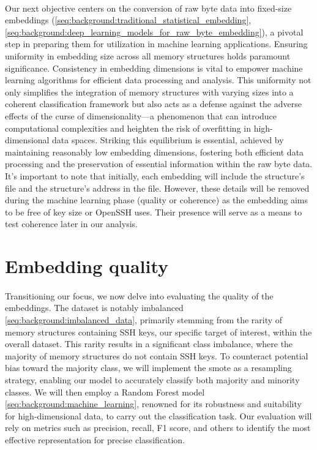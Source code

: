     \paragraph{}Our next objective centers on the conversion of raw byte data into fixed-size embeddings (\ref{seq:background:traditional_statistical_embedding}, \ref{seq:background:deep_learning_models_for_raw_byte_embedding}), a pivotal step in preparing them for utilization in machine learning applications. Ensuring uniformity in embedding size across all memory structures holds paramount significance. Consistency in embedding dimensions is vital to empower machine learning algorithms for efficient data processing and analysis. This uniformity not only simplifies the integration of memory structures with varying sizes into a coherent classification framework but also acts as a defense against the adverse effects of the curse of dimensionality—a phenomenon that can introduce computational complexities and heighten the risk of overfitting in high-dimensional data spaces. Striking this equilibrium is essential, achieved by maintaining reasonably low embedding dimensions, fostering both efficient data processing and the preservation of essential information within the raw byte data. It's important to note that initially, each embedding will include the structure's file and the structure's address in the file. However, these details will be removed during the machine learning phase (quality or coherence) as the embedding aims to be free of key size or OpenSSH uses. Their presence will serve as a means to test coherence later in our analysis.

    \section{Embedding quality}
    \paragraph{} Transitioning our focus, we now delve into evaluating the quality of the embeddings. The dataset is notably imbalanced \ref{seq:background:imbalanced_data}, primarily stemming from the rarity of memory structures containing SSH keys, our specific target of interest, within the overall dataset. This rarity results in a significant class imbalance, where the majority of memory structures do not contain SSH keys. To counteract potential bias toward the majority class, we will implement the \acrfull{smote} as a resampling strategy, enabling our model to accurately classify both majority and minority classes. We will then employ a Random Forest model \ref{seq:background:machine_learning}, renowned for its robustness and suitability for high-dimensional data, to carry out the classification task. Our evaluation will rely on metrics such as precision, recall, F1 score, and others to identify the most effective representation for precise classification.

